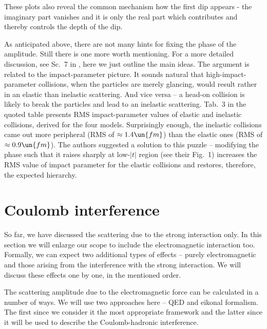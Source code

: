These plots also reveal the common mechanism how the first dip appears - the imaginary part vanishes and it is only the real part which contributes and thereby controls the depth of the dip.



As anticipated above, there are not many hints for fixing the phase of the amplitude. Still there is one more worth mentioning. For a more detailed discussion, see Sc.~7 in , here we just outline the main ideas. The argument is related to the impact-parameter picture. It sounds natural that high-impact-parameter collisions, when the particles are merely glancing, would result rather in an elastic than inelastic scattering. And vice versa -- a head-on collision is likely to break the particles and lead to an inelastic scattering. Tab.~3 in the quoted table presents RMS impact-parameter values of elastic and inelastic collisions, derived for the four models. Surprisingly enough, the inelastic collisions came out more peripheral (RMS of $\approx 1.4\un{fm}$) than the elastic ones (RMS of $\approx 0.9\un{fm}$). The authors suggested a solution to this puzzle -- modifying the phase such that it raises sharply at low-$|t|$ region (see their Fig.~1) increases the RMS value of impact parameter for the elastic collisions and restores, therefore, the expected hierarchy.

\section[el coulomb]{Coulomb interference}

So far, we have discussed the scattering due to the strong interaction only. In this section we will enlarge our scope to include the electromagnetic interaction too. Formally, we can expect two additional types of effects -- purely electromagnetic and those arising from the interference with the strong interaction. We will discuss these effects one by one, in the mentioned order.

The scattering amplitude due to the electromagnetic force can be calculated in a number of ways. We will use two approaches here -- QED and eikonal formalism. The first since we consider it the most appropriate framework and the latter since it will be used to describe the Coulomb-hadronic interference.

